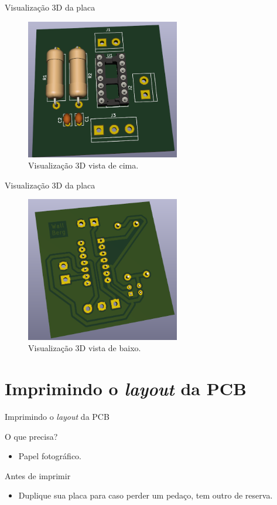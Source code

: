 \documentclass{beamer}
\begin{document}
\begin{frame}{Visualização 3D da placa}
	\begin{figure}
		\centering
		\includegraphics[width=0.6\textwidth]{Imagens/40_3d_view.png}
		\caption{Visualização 3D vista de cima.}
	\end{figure}
\end{frame}

\begin{frame}{Visualização 3D da placa}
	\begin{figure}
		\centering
		\includegraphics[width=0.6\textwidth]{Imagens/40_3d_view_2.png}
		\caption{Visualização 3D vista de baixo.}
	\end{figure}
\end{frame}

\section{Imprimindo o \textit{layout} da PCB}
\begin{frame}{Imprimindo o \textit{layout} da PCB}
	\begin{block}{O que precisa?}
		\begin{itemize}
			\item Papel fotográfico.
		\end{itemize}
	\end{block}
	\begin{block}{Antes de imprimir}
		\begin{itemize}
			\item Duplique sua placa para caso perder um pedaço, tem outro de reserva.
		\end{itemize}
	\end{block}
\end{frame}
\end{document}
